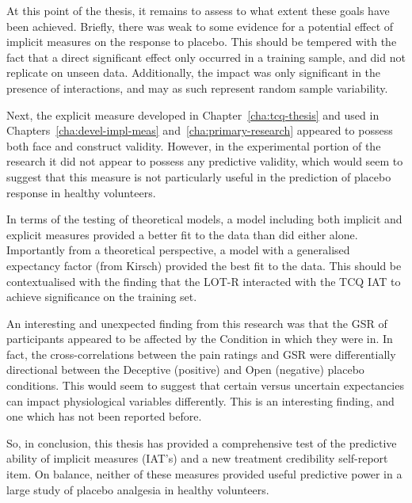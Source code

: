 At this point of the thesis, it remains to assess to what extent these goals have been achieved. Briefly, there was weak to some evidence for a potential effect of implicit measures on the response to placebo. This should be tempered with the fact that a direct significant effect only occurred in a training sample, and did not replicate on unseen data. Additionally, the impact was only significant in the presence of interactions, and may as such represent random sample variability. 

Next, the explicit measure developed in Chapter~\ref{cha:tcq-thesis} and used in Chapters~\ref{cha:devel-impl-meas} and~\ref{cha:primary-research} appeared to possess both face and construct validity. However, in the experimental portion of the research it did not appear to possess any predictive validity, which would seem to suggest that this measure is not particularly useful in the prediction of placebo response in healthy volunteers. 

In terms of the testing of theoretical models, a model including both implicit and explicit measures provided a better fit to the data than did either alone. Importantly from a theoretical perspective, a model with a generalised expectancy factor (from Kirsch) provided the best fit to the data. This should be contextualised with the finding that the LOT-R interacted with the TCQ IAT to achieve significance on the training set.

An interesting and unexpected finding from this research was that the GSR of participants appeared to be affected by the Condition in which they were in. In fact, the cross-correlations between the pain ratings and GSR were differentially directional between the Deceptive (positive) and Open (negative) placebo conditions. This would seem to suggest that certain versus uncertain expectancies can impact physiological variables differently. This is an interesting finding, and one which has not been reported before. 

So, in conclusion, this thesis has provided a comprehensive test of the predictive ability of implicit measures (IAT's) and a new treatment credibility self-report item. On balance, neither of these measures provided useful predictive power in a large study of placebo analgesia in healthy volunteers. 

